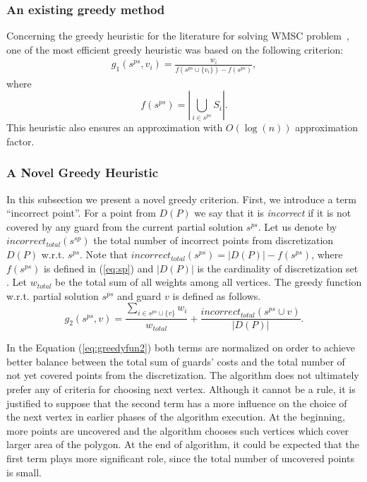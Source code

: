 \documentclass[runningheads,a4paper]{elsarticle}
\begin{document}
	\subsubsection{An existing greedy method}
	
	Concerning the greedy heuristic for the literature for solving WMSC problem~\cite{chvatal1979greedy, lovasz1975ratio}, one of the most efficient greedy heuristic was based on the following criterion:
	\begin{align}\label{eq:Lovasz}
	g_1(s^{ps}, v_i) = \frac{w_{i}}{ f(s^{ps} \cup \{v_i\})  - f(s^{ps})},
	\end{align}
	where
\begin{equation}\label{eq:sp}
    f(s^{ps}) = \left|\bigcup_{i \in s^{ps}} S_i \right|.
    \end{equation}
	This heuristic  also ensures an approximation with $O(\log(n))$ approximation factor.
	
	\subsubsection{A Novel Greedy Heuristic}
	In this subsection we present a novel greedy criterion. First, we introduce a term  ``incorrect point''. For a point from $D(P)$ we say that it is \textit{incorrect} if it is not covered by any guard from the current partial solution $s^{ps}$. Let us denote by $incorrect_{total}(s^{sp})$ the total number of incorrect points from discretization $D(P)$ w.r.t. $s^{ps}$. Note that  $incorrect_{total}(s^{ps}) = |D(P)|-f(s^{ps})$, where $f(s^{ps})$ is defined in (\ref{eq:sp}) and $|D(P)|$ is the cardinality of discretization set . Let $w_{total}$ be the total sum of all weights among all vertices. The greedy function w.r.t. partial solution $s^{ps}$ and  guard $v$ is defined as follows.
	\begin{equation}\label{eq:greedyfun2}
    g_2(s^{ps}, v)  =    \frac{\sum_{i \in s^{ps} \cup \{v\}} w_i}{w_{total}}+ \frac{incorrect_{total}(s^{ps}\cup v)}{|D(P)|}.
	\end{equation}

	In the Equation  (\ref{eq:greedyfun2}) both terms are normalized on order to achieve better balance between the total sum of guards' costs and the total number of not yet covered points from the discretization. The algorithm does not  ultimately prefer any of criteria for choosing next vertex. Although it cannot be a rule, it is justified to suppose that the second term has a more influence on the choice of the next vertex in earlier phases of the algorithm execution. At the beginning, more points are uncovered and the algorithm  chooses such vertices which cover larger area of the polygon. At the end of algorithm, it could be expected that the first term plays more significant role, since the total number of uncovered points is small.
	
\end{document}
